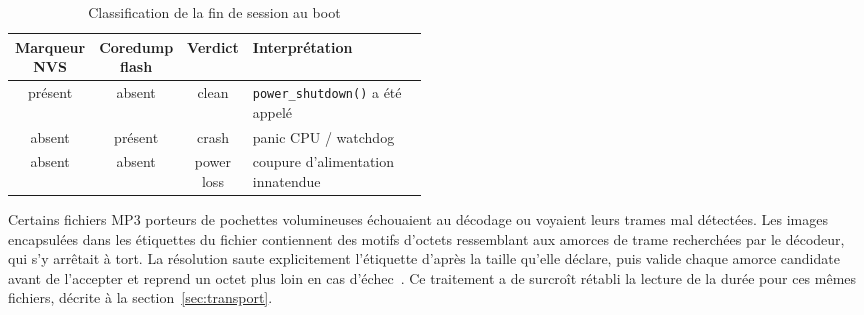 \begin{table}[H]
  \centering
  \caption{Classification de la fin de session au boot}
  \label{tab:verdict_extinction}
  {\renewcommand{\arraystretch}{1.1}
    \setlength{\tabcolsep}{4pt}
    \begin{tabular}{@{}c c c >{\raggedright\arraybackslash}p{0.48\linewidth}@{}}
      \hline
      Marqueur NVS & Coredump flash & Verdict    & Interprétation                          \\
      \hline
      présent      & absent         & clean      & \texttt{power\_shutdown()} a été appelé \\
      absent       & présent        & crash      & panic CPU / watchdog                    \\
      absent       & absent         & power loss & coupure d'alimentation innatendue       \\
      \hline
    \end{tabular}}
\end{table}


Certains fichiers MP3 porteurs de pochettes volumineuses échouaient au décodage ou voyaient leurs trames mal détectées. Les images encapsulées dans les étiquettes du fichier contiennent des motifs d'octets ressemblant aux amorces de trame recherchées par le décodeur, qui s'y arrêtait à tort. La résolution saute explicitement l'étiquette d'après la taille qu'elle déclare, puis valide chaque amorce candidate avant de l'accepter et reprend un octet plus loin en cas d'échec~\cite{helix_mp3_decoder}. Ce traitement a de surcroît rétabli la lecture de la durée pour ces mêmes fichiers, décrite à la section~\ref{sec:transport}.